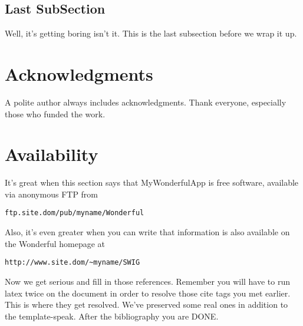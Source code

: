 \documentclass[letterpaper,twocolumn,10pt]{article}
\begin{document}
\subsection{Last SubSection}

Well, it's getting boring isn't it.  This is the last subsection
before we wrap it up.

\section{Acknowledgments}

A polite author always includes acknowledgments.  Thank everyone,
especially those who funded the work. 

\section{Availability}

It's great when this section says that MyWonderfulApp is free software, 
available via anonymous FTP from

\begin{center}
{\tt ftp.site.dom/pub/myname/Wonderful}\\
\end{center}

Also, it's even greater when you can write that information is also 
available on the Wonderful homepage at 

\begin{center}
{\tt http://www.site.dom/\~{}myname/SWIG}
\end{center}

Now we get serious and fill in those references.  Remember you will
have to run latex twice on the document in order to resolve those
cite tags you met earlier.  This is where they get resolved.
We've preserved some real ones in addition to the template-speak.
After the bibliography you are DONE.

{\footnotesize 
}


\theendnotes
\end{document}
